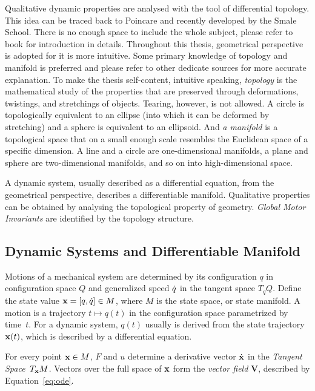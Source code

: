 Qualitative dynamic properties are analysed with the tool of differential topology.
This idea can be traced back to Poincare\citep{Poincar'e1899,Poincar'e1885} and recently developed by the Smale School\citep{Smale1970}.
There is no enough space to include the whole subject, please refer to book \citep{abraham1978foundations}for introduction in details.
Throughout this thesis,  geometrical perspective is adopted for it is more intuitive.
Some primary knowledge of topology and manifold is preferred and please refer to other dedicate sources for more accurate explanation. To make the thesis self-content, intuitive speaking,   \emph{topology} is the mathematical study of the properties that are preserved through deformations, twistings, and stretchings of objects. Tearing, however, is not allowed. A circle is topologically equivalent to an ellipse (into which it can be deformed by stretching) and a sphere is equivalent to an ellipsoid. And \emph{a manifold} is a topological space that on a small enough scale resembles the Euclidean space of a specific dimension.  A line and a circle are one-dimensional manifolds, a plane and sphere  are two-dimensional manifolds, and so on into high-dimensional space.


A dynamic system, usually described as a differential equation, from the geometrical perspective, describes a differentiable manifold.
Qualitative properties can be obtained by analysing the topological  property of geometry.
\emph{Global Motor Invariants} are identified by the topology structure.





\subsection{Dynamic Systems and Differentiable Manifold}
Motions of a mechanical system are determined by its configuration  $q$ in configuration space $Q$ and generalized speed $\dot{q}$ in the tangent space $T_{q}Q$. 
Define the state value $\mathbf{x}=[q,\dot{q}] \in M$, where $M$ is the state space, or state manifold.
A motion is a trajectory $t \mapsto q(t)$ in the configuration space parametrized by time~$t$.
For a dynamic system, $q(t)$ usually is derived from the state trajectory $\mathbf{x}(t)$, which is described by a differential equation. 



For every point $\mathbf{x} \in M$, 
$F$ and $u$ determine a derivative vector $\dot{\mathbf{x}}$ in the \emph{Tangent Space}~$T_{\mathbf{x}}M$. 
Vectors over the full space of $\mathbf{x}$ form the \emph{vector field} $\mathbf{V}$, described by Equation~\ref{eq:ode}.

